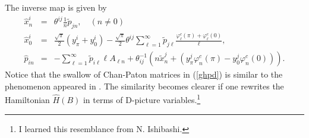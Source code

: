 \documentclass[a4paper,12pt]{article}
\newcommand{\co}{\varphi^c}
\begin{document}
The inverse map is given by
\begin{eqnarray}
\hat{x}^i_n
&=&
\theta^{ij} \frac{1}{n} \tilde{p}_{jn},
\quad (n \ne 0) 
\label{ghxnd}
\\
\hat{x}_0^i
&=&
\frac{\sqrt{\pi}}{2}
\left(
y_\pi^i + y_0^i
\right)
-\frac{\sqrt{\pi}}{2} \theta^{ij}
\sum_{\ell=1}^\infty
\tilde{p}_{j \ell}
\frac{\co_\ell(\pi) + \co_\ell(0)}{\ell}, 
\label{ghx0d}\\
%
\hat{p}_{in}
&=&
- \sum_{\ell = 1}^\infty
\tilde{p}_{i \ell} \ell A_{\ell n}
+
\theta^{-1}_{ij}
\left(
n \tilde{x}_n^j +
  \left(
 y_\pi^j   \co_n(\pi) -
 y_0^j   \co_n(0)  
  \right) 
\right).
\label{ghpd}
\end{eqnarray}
Notice that the swallow of
Chan-Paton matrices in (\ref{ghpd})
is similar to the phenomenon appeared in \cite{AL}.
The similarity  becomes clearer 
if one rewrites the
Hamiltonian $\hat{H}(B)$
in terms of D-picture variables.\footnote{
I learned this resemblance
from N. Ishibashi.}
\end{document}
